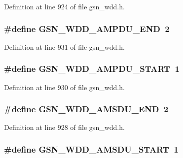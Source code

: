 Definition at line 924 of file gsn\_\-wdd.h.

\hypertarget{a00603_a1ea4e46accb95280634fb24898502942}{
\subsubsection[{GSN\_\-WDD\_\-AMPDU\_\-END}]{\setlength{\rightskip}{0pt plus 5cm}\#define GSN\_\-WDD\_\-AMPDU\_\-END~2}}
\label{a00603_a1ea4e46accb95280634fb24898502942}


Definition at line 931 of file gsn\_\-wdd.h.

\hypertarget{a00603_a78add8013309f477df4ce6fb69e28e5c}{
\subsubsection[{GSN\_\-WDD\_\-AMPDU\_\-START}]{\setlength{\rightskip}{0pt plus 5cm}\#define GSN\_\-WDD\_\-AMPDU\_\-START~1}}
\label{a00603_a78add8013309f477df4ce6fb69e28e5c}


Definition at line 930 of file gsn\_\-wdd.h.

\hypertarget{a00603_a22a45b0beca366e846d2a88a1dba6777}{
\subsubsection[{GSN\_\-WDD\_\-AMSDU\_\-END}]{\setlength{\rightskip}{0pt plus 5cm}\#define GSN\_\-WDD\_\-AMSDU\_\-END~2}}
\label{a00603_a22a45b0beca366e846d2a88a1dba6777}


Definition at line 928 of file gsn\_\-wdd.h.

\hypertarget{a00603_a12348d97f30d004b6b377f53be35af6b}{
\subsubsection[{GSN\_\-WDD\_\-AMSDU\_\-START}]{\setlength{\rightskip}{0pt plus 5cm}\#define GSN\_\-WDD\_\-AMSDU\_\-START~1}}
\label{a00603_a12348d97f30d004b6b377f53be35af6b}


